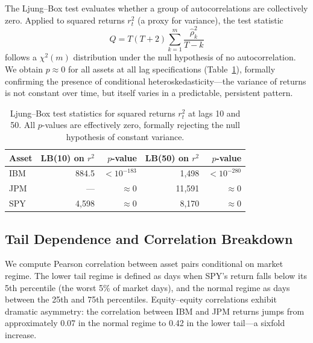 \documentclass[11pt,a4paper]{article}
\begin{document}
The Ljung--Box test \citep{ljungbox1978} evaluates whether a group of autocorrelations are collectively zero.
Applied to squared returns $r_t^2$ (a proxy for variance), the test statistic
\begin{equation}
\label{eq:ljungbox}
Q = T(T+2)\sum_{k=1}^{m} \frac{\hat{\rho}_k^2}{T-k}
\end{equation}
follows a $\chi^2(m)$ distribution under the null hypothesis of no autocorrelation.
We obtain $p \approx 0$ for all assets at all lag specifications (Table~\ref{tab:ljungbox}), formally confirming the presence of conditional heteroskedasticity---the variance of returns is not constant over time, but itself varies in a predictable, persistent pattern.

\begin{table}[H]
\centering
\caption{Ljung--Box test statistics for squared returns $r_t^2$ at lags 10 and 50. All $p$-values are effectively zero, formally rejecting the null hypothesis of constant variance.}
\label{tab:ljungbox}
\small
\begin{tabular}{@{}lrrrr@{}}
\toprule
\textbf{Asset} & \textbf{LB(10) on $r^2$} & \textbf{$p$-value} & \textbf{LB(50) on $r^2$} & \textbf{$p$-value} \\
\midrule
IBM & 884.5  & $<10^{-183}$ & 1{,}498  & $<10^{-280}$ \\
JPM & ---    & $\approx 0$  & 11{,}591 & $\approx 0$  \\
SPY & 4{,}598 & $\approx 0$ & 8{,}170  & $\approx 0$  \\
\bottomrule
\end{tabular}
\end{table}

\subsection{Tail Dependence and Correlation Breakdown}
\label{sec:taildep}

We compute Pearson correlation between asset pairs conditional on market regime.
The lower tail regime is defined as days when SPY's return falls below its 5th percentile (the worst 5\% of market days), and the normal regime as days between the 25th and 75th percentiles.
Equity--equity correlations exhibit dramatic asymmetry: the correlation between IBM and JPM returns jumps from approximately 0.07 in the normal regime to 0.42 in the lower tail---a sixfold increase.
\end{document}

